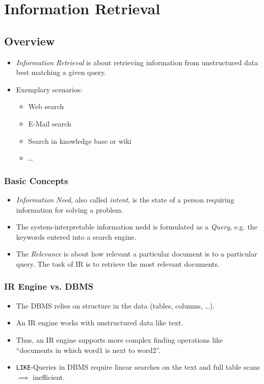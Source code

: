 \chapter{Information Retrieval} %
    \section{Overview} %
        \begin{itemize}
        	\item \textit{Information Retrieval} is about retrieving information from unstructured data best matching a given query.
        	\item Exemplary scenarios:
        		\begin{itemize}
        			\item Web search
        			\item E-Mail search
        			\item Search in knowledge base or wiki
        			\item \dots
        		\end{itemize}
        \end{itemize}

        \subsection{Basic Concepts} %
            \begin{itemize}
            	\item \textit{Information Need}, also called \textit{intent}, is the state of a person requiring information for solving a problem.
            	\item The system-interpretable information nedd is formulated as a \textit{Query}, e.g. the keywords entered into a search engine.
            	\item The \textit{Relevance} is about how relevant a particular document is to a particular query. The task of IR is to retrieve the most relevant documents.
            \end{itemize}

        \subsection{IR Engine vs. DBMS} %
            \begin{itemize}
            	\item The DBMS relies on structure in the data (tables, columns, \dots).
            	\item An IR engine works with unstructured data like text.
            	\item Thus, an IR engine supports more complex finding operations like \enquote{documents in which word1 is next to word2}.
            	\item \lstinline|LIKE|-Queries in DBMS require linear searches on the text and full table scans \(\implies\) inefficient.
            \end{itemize}

